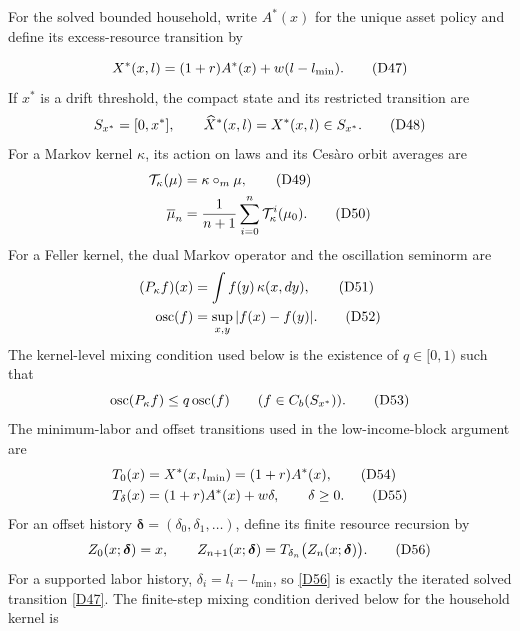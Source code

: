 \documentclass[11pt]{article}
\newcommand{\eqD}[1]{\refstepcounter{equation}\tag{D#1}}
\begin{document}
For the solved bounded household, write $A^*(x)$ for the unique asset
policy and define its excess-resource transition by

\begin{equation}
 X^*(x,l)=(1+r)A^*(x)+w(l-l_{\min}).
 \eqD{47}\label{D47}
\end{equation}
If $x^*$ is a drift threshold, the compact state and its restricted
transition are
\begin{equation}
 S_{x^*}=[0,x^*],\qquad
 \widehat X^*(x,l)=X^*(x,l)\in S_{x^*}.
 \eqD{48}\label{D48}
\end{equation}
For a Markov kernel \(\kappa\), its action on laws and its Cesàro orbit
averages are
\begin{align}
 \mathcal T_\kappa(\mu)&=\kappa\circ_m\mu,
 \eqD{49}\label{D49}\\
 \overline\mu_n&=\frac1{n+1}\sum_{i=0}^{n}
   \mathcal T_\kappa^i(\mu_0).
 \eqD{50}\label{D50}
\end{align}
For a Feller kernel, the dual Markov operator and the oscillation seminorm are
\begin{align}
 (P_\kappa f)(x)&=\int f(y)\,\kappa(x,dy),
 \eqD{51}\label{D51}\\
 \operatorname{osc}(f)&=\sup_{x,y}|f(x)-f(y)|.
 \eqD{52}\label{D52}
\end{align}
The kernel-level mixing condition used below is the existence of
\(q\in[0,1)\) such that
\begin{equation}
 \operatorname{osc}(P_\kappa f)\le q\operatorname{osc}(f)
 \qquad(f\in C_b(S_{x^*})).
 \eqD{53}\label{D53}
\end{equation}
The minimum-labor and offset transitions used in the low-income-block
argument are
\begin{align}
 T_0(x)&=X^*(x,l_{\min})=(1+r)A^*(x),
 \eqD{54}\label{D54}\\
 T_\delta(x)&=(1+r)A^*(x)+w\delta,
 \qquad \delta\ge0. \eqD{55}\label{D55}
\end{align}
For an offset history $\boldsymbol\delta=(\delta_0,\delta_1,\ldots)$,
define its finite resource recursion by
\begin{equation}
 Z_0(x;\boldsymbol\delta)=x,\qquad
 Z_{n+1}(x;\boldsymbol\delta)
   =T_{\delta_n}\bigl(Z_n(x;\boldsymbol\delta)\bigr).
 \eqD{56}\label{D56}
\end{equation}
For a supported labor history, $\delta_i=l_i-l_{\min}$, so
\eqref{D56} is exactly the iterated solved transition \eqref{D47}.
The finite-step mixing condition derived below for the household kernel is
\end{document}
